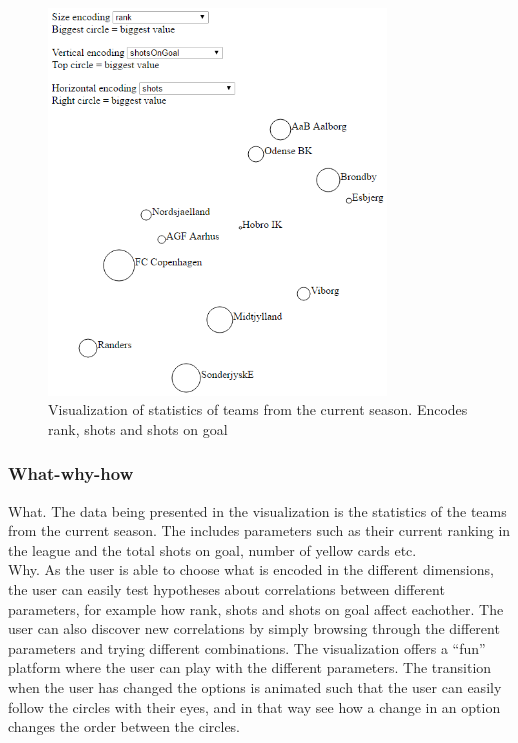 \documentclass[Report.tex]{subfiles}
\begin{document}
\begin{figure}
\center
\includegraphics[width=0.8\textwidth]{"Figures/bubble_chart"}
\caption{Visualization of statistics of teams from the current season. Encodes rank, shots and shots on goal}
\label{Fig:Bubbleviz}
\end{figure}

\subsubsection{What-why-how}
What. The data being presented in the visualization is the statistics of the teams from the current season. The includes parameters such as their current ranking in the league and the total shots on goal, number of yellow cards etc.\\

\noindent Why. As the user is able to choose what is encoded in the different dimensions, the user can easily test hypotheses about correlations between different parameters, for example how rank, shots and shots on goal affect eachother. The user can also discover new correlations by simply browsing through the different parameters and trying different combinations. The visualization offers a ``fun'' platform where the user can play with the different parameters. The transition when the user has changed the options is animated such that the user can easily follow the circles with their eyes, and in that way see how a change in an option changes the order between the circles.\\
\end{document}
